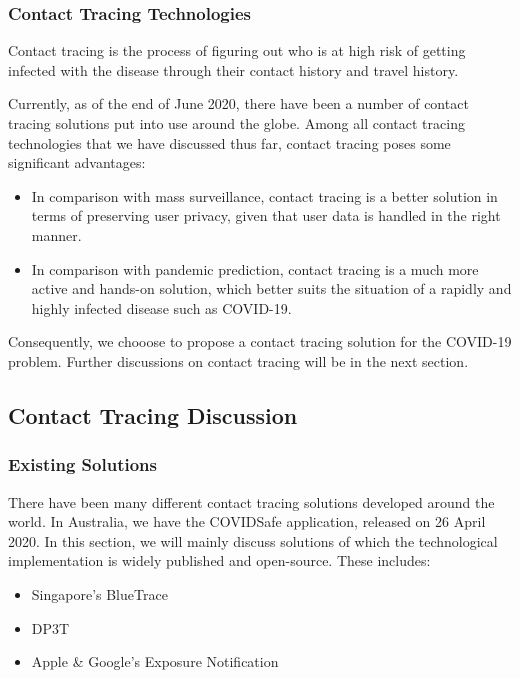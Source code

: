       \subsubsection{Contact Tracing Technologies}
        \par Contact tracing is the process of figuring out who is at high risk of getting infected with the disease through their contact history and travel history.
        \par Currently, as of the end of June 2020, there have been a number of contact tracing solutions put into use around the globe. Among all contact tracing technologies that we have discussed thus far, contact tracing poses some significant advantages:
        \begin{itemize}
          \item In comparison with mass surveillance, contact tracing is a better solution in terms of preserving user privacy, given that user data is handled in the right manner.
          \item In comparison with pandemic prediction, contact tracing is a much more active and hands-on solution, which better suits the situation of a rapidly and highly infected disease such as COVID-19.
        \end{itemize}
        \par Consequently, we chooose to propose a contact tracing solution for the COVID-19 problem. Further discussions on contact tracing will be in the next section.

  \subsection{Contact Tracing Discussion}
    \subsubsection{Existing Solutions}
      \par There have been many different contact tracing solutions developed around the world. In Australia, we have the COVIDSafe application, released on 26 April 2020. In this section, we will mainly discuss solutions of which the technological implementation is widely published and open-source. These includes:
        \begin{itemize}
          \item Singapore’s BlueTrace
          \item DP3T
          \item Apple \& Google's Exposure Notification
        \end{itemize}
    
